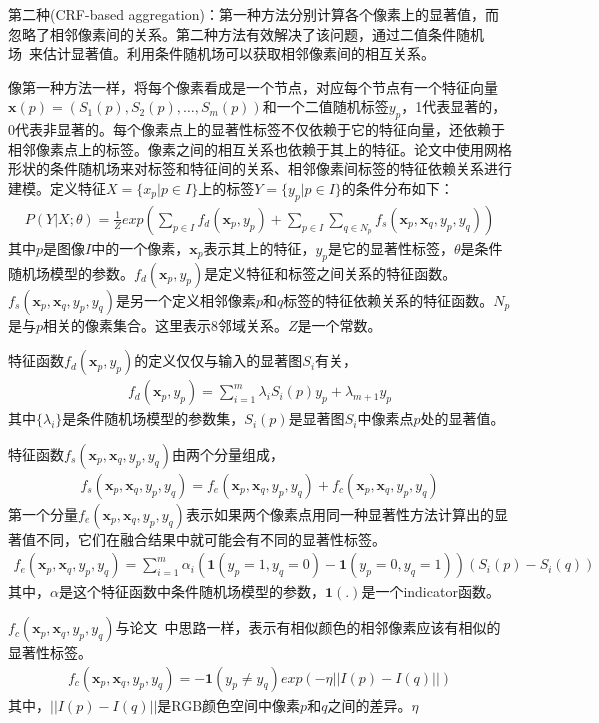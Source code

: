 \documentclass[12pt]{article}
\begin{document}
第二种(CRF-based aggregation)：第一种方法分别计算各个像素上的显著值，而忽略了相邻像素间的关系。第二种方法有效解决了该问题，通过二值条件随机场~\cite{lafferty2001conditional}来估计显著值。利用条件随机场可以获取相邻像素间的相互关系。

像第一种方法一样，将每个像素看成是一个节点，对应每个节点有一个特征向量$\textbf{x}(p) = (S_1(p), S_2(p), \ldots, S_m(p))$和一个二值随机标签$y_p$，1代表显著的，0代表非显著的。每个像素点上的显著性标签不仅依赖于它的特征向量，还依赖于相邻像素点上的标签。像素之间的相互关系也依赖于其上的特征。论文中使用网格形状的条件随机场来对标签和特征间的关系、相邻像素间标签的特征依赖关系进行建模。定义特征$X=\{x_p|p\in I\}$上的标签$Y=\{y_p|p \in I\}$的条件分布如下：
\begin{align}
P(Y|X;\theta) = \frac{1}{Z}exp(\sum_{p\in I}f_d(\textbf{x}_p, y_p)+\sum_{p \in I}\sum_{q\in N_p}f_s(\textbf{x}_p, \textbf{x}_q, y_p, y_q))
\end{align}
其中$p$是图像$I$中的一个像素，$\textbf{x}_p$表示其上的特征，$y_p$是它的显著性标签，$\theta$是条件随机场模型的参数。$f_d(\textbf{x}_p, y_p)$是定义特征和标签之间关系的特征函数。$f_s(\textbf{x}_p, \textbf{x}_q, y_p, y_q)$是另一个定义相邻像素$p$和$q$标签的特征依赖关系的特征函数。$N_p$是与$p$相关的像素集合。这里表示8邻域关系。$Z$是一个常数。

特征函数$f_d(\textbf{x}_p, y_p)$的定义仅仅与输入的显著图$S_i$有关，
\begin{align}
f_d(\textbf{x}_p, y_p) = \sum_{i=1}^{m}\lambda_iS_i(p)y_p+\lambda_{m+1}y_p
\end{align}
其中$\{\lambda_i\}$是条件随机场模型的参数集，$S_i(p)$是显著图$S_i$中像素点$p$处的显著值。

特征函数$f_s(\textbf{x}_p, \textbf{x}_q, y_p, y_q)$由两个分量组成，
\begin{align}
f_s(\textbf{x}_p, \textbf{x}_q, y_p, y_q) = f_e(\textbf{x}_p, \textbf{x}_q, y_p, y_q)+f_c(\textbf{x}_p, \textbf{x}_q, y_p, y_q)
\end{align}
第一个分量$f_e(\textbf{x}_p, \textbf{x}_q, y_p, y_q)$表示如果两个像素点用同一种显著性方法计算出的显著值不同，它们在融合结果中就可能会有不同的显著性标签。
\begin{align}
f_e(\textbf{x}_p, \textbf{x}_q, y_p, y_q) = \sum_{i=1}^{m}\alpha_i(\textbf{1}(y_p=1, y_q=0)-\textbf{1}(y_p=0, y_q=1))(S_i(p)-S_i(q))
\end{align}
其中，$\alpha$是这个特征函数中条件随机场模型的参数，$\textbf{1}(.)$是一个indicator函数。

$f_c(\textbf{x}_p, \textbf{x}_q, y_p, y_q)$与论文~\cite{liu2011learning}中思路一样，表示有相似颜色的相邻像素应该有相似的显著性标签。
\begin{align}
f_c(\textbf{x}_p, \textbf{x}_q, y_p, y_q) = -\textbf{1}(y_p\ne y_q)exp(-\eta||I(p)-I(q)||)
\end{align}
其中，$||I(p)-I(q)||$是RGB颜色空间中像素$p$和$q$之间的差异。$\eta$




%


\end{document}
